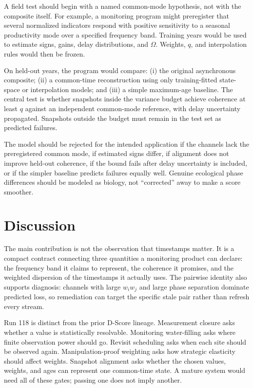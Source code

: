 \documentclass[10pt]{article}
\begin{document}
A field test should begin with a named common-mode hypothesis, not with the
composite itself.  For example, a monitoring program might preregister that
several normalized indicators respond with positive sensitivity to a seasonal
productivity mode over a specified frequency band.  Training years would be
used to estimate signs, gains, delay distributions, and $\Omega$.  Weights,
$q$, and interpolation rules would then be frozen.

On held-out years, the program would compare: (i) the original asynchronous
composite; (ii) a common-time reconstruction using only training-fitted
state-space or interpolation models; and (iii) a simple maximum-age baseline.
The central test is whether snapshots inside the variance budget achieve
coherence at least $q$ against an independent common-mode reference, with delay
uncertainty propagated.  Snapshots outside the budget must remain in the test
set as predicted failures.

The model should be rejected for the intended application if the channels lack
the preregistered common mode, if estimated signs differ, if alignment does not
improve held-out coherence, if the bound fails after delay uncertainty is
included, or if the simpler baseline predicts failures equally well.  Genuine
ecological phase differences should be modeled as biology, not ``corrected''
away to make a score smoother.

\section{Discussion}

The main contribution is not the observation that timestamps matter.  It is a
compact contract connecting three quantities a monitoring product can declare:
the frequency band it claims to represent, the coherence it promises, and the
weighted dispersion of the timestamps it actually uses.  The pairwise identity
also supports diagnosis: channels with large $w_iw_j$ and large phase separation
dominate predicted loss, so remediation can target the specific stale pair
rather than refresh every stream.

Run 118 is distinct from the prior D-Score lineage.  Measurement closure asks
whether a value is statistically resolvable.  Monitoring water-filling asks
where finite observation power should go.  Revisit scheduling asks when each
site should be observed again.  Manipulation-proof weighting asks how strategic
elasticity should affect weights.  Snapshot alignment asks whether the chosen
values, weights, and ages can represent one common-time state.  A mature system
would need all of these gates; passing one does not imply another.
\end{document}
